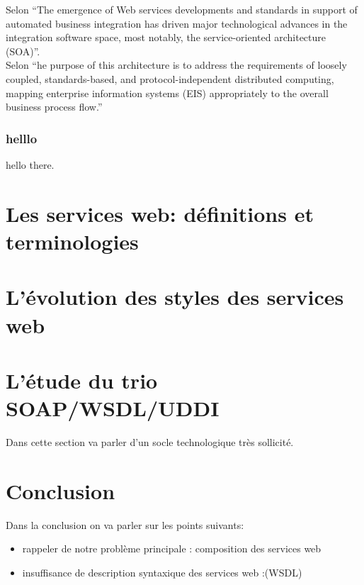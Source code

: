 	    Selon \cite{Papazoglou:2007:SOA:1265289.1265298} ``The emergence of Web services developments and 
	    standards in support of automated business integration has driven major technological advances in the 
	    integration software space, most notably, the service-oriented architecture (SOA)''.\\

	    Selon \cite{Fremantle:2002:ES:570907.570935} ``he purpose of this architecture is to address the 
	    requirements of loosely coupled, standards-based, and protocol-independent distributed computing, 
	    mapping enterprise information systems (EIS) appropriately to the overall business process flow.''\\
	    
       \subsubsection{helllo}
	  hello there.

    \section{Les services web: définitions et terminologies}
	\cite{srivastava2003web}

    \section{L'évolution des styles des services web}


    \section{L'étude du trio SOAP/WSDL/UDDI}
	Dans cette section va parler d'un socle technologique très sollicité.


    \section{Conclusion}
	Dans la conclusion on va parler sur les points suivants:\\
    \begin{itemize}	
	\item {rappeler de notre problème principale : composition des services web }
	\item {insuffisance de description syntaxique des services web :(WSDL)}
    \end{itemize}


    

